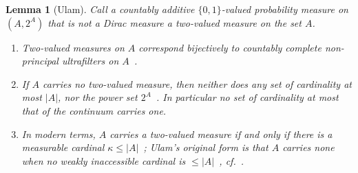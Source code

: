 \documentclass[11pt,a4paper]{article}
\theoremstyle{plain}
\newtheorem{lemma}[theorem]{Lemma}
\theoremstyle{definition}
\theoremstyle{remark}
\begin{document}
\begin{lemma}[Ulam]\label{lem:app-ulam}
Call a countably additive $\{0,1\}$-valued probability measure on
$(A, 2^{A})$ that is not a Dirac measure a \emph{two-valued measure} on the
set $A$.
\begin{enumerate}
\item Two-valued measures on $A$ correspond bijectively to countably
complete non-principal ultrafilters on $A$~\cite[(10.3)--(10.4)]{jech_set_2003}.
\item If $A$ carries no two-valued measure, then neither does any set of
cardinality at most $|A|$, nor the power set
$2^{A}$~\cite[Bem.~2 and Satz~1]{ulam_masstheorie_1930}. In particular no
set of cardinality at most that of the continuum carries one.
\item In modern terms, $A$ carries a two-valued measure if and only if there
is a measurable cardinal $\kappa \le |A|$~\cite[Lemma~10.2 and
Def.~10.3]{jech_set_2003}; Ulam's original form is that $A$ carries none
when no weakly inaccessible cardinal is
$\le |A|$~\cite[Satz~(A)]{ulam_masstheorie_1930}, cf.~\cite[Thm.~10.1]{jech_set_2003}.
\end{enumerate}
\end{lemma}
\end{document}
